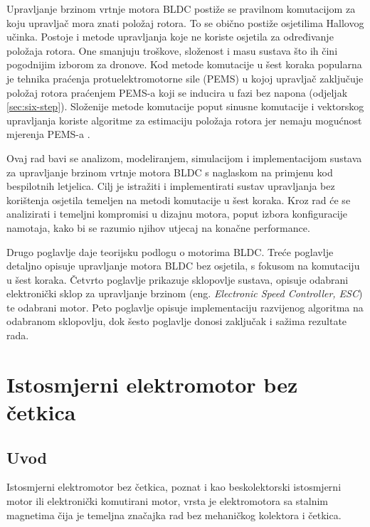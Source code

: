 \documentclass[diplomskirad]{fer}
\begin{document}
Upravljanje brzinom vrtnje motora BLDC postiže se pravilnom komutacijom za koju
upravljač mora znati položaj rotora. To se obično postiže osjetilima Hallovog
učinka. Postoje i metode upravljanja koje ne koriste osjetila za određivanje
položaja rotora. One smanjuju troškove, složenost i masu sustava što ih čini
pogodnijim izborom za dronove. Kod metode komutacije u šest koraka popularna je
tehnika praćenja protuelektromotorne sile (PEMS) u kojoj upravljač zaključuje
položaj rotora praćenjem PEMS-a koji se inducira u fazi bez napona (odjeljak
\ref{sec:six-step}). Složenije metode komutacije poput sinusne komutacije i
vektorskog upravljanja koriste algoritme za estimaciju položaja rotora jer
nemaju mogućnost mjerenja PEMS-a \cite{NXP_AN2355}.

Ovaj rad bavi se analizom, modeliranjem, simulacijom i implementacijom sustava
za upravljanje brzinom vrtnje motora BLDC s naglaskom na primjenu kod
bespilotnih letjelica. Cilj je istražiti i implementirati sustav upravljanja
bez korištenja osjetila temeljen na metodi komutacije u šest koraka. Kroz
rad će se analizirati i temeljni kompromisi u dizajnu motora, poput izbora
konfiguracije namotaja, kako bi se razumio njihov utjecaj na konačne
performance.

Drugo poglavlje daje teorijsku podlogu o motorima BLDC. Treće poglavlje
detaljno opisuje upravljanje motora BLDC bez osjetila, s fokusom na komutaciju
u šest koraka. Četvrto poglavlje prikazuje sklopovlje sustava, opisuje odabrani
elektronički sklop za upravljanje brzinom (eng. \textit{Electronic Speed
	Controller, ESC}) te odabrani motor. Peto poglavlje opisuje implementaciju
razvijenog algoritma na odabranom sklopovlju, dok šesto poglavlje donosi zaključak i sažima rezultate rada.
\chapter{Istosmjerni elektromotor bez četkica}
\label{pog:bldc}
\section{Uvod}
\label{sec:bldc:uvod}

Istosmjerni elektromotor bez četkica, poznat i kao beskolektorski istosmjerni
motor ili elektronički komutirani motor, vrsta je elektromotora sa stalnim
magnetima čija je temeljna značajka rad bez mehaničkog kolektora i četkica.
\end{document}
